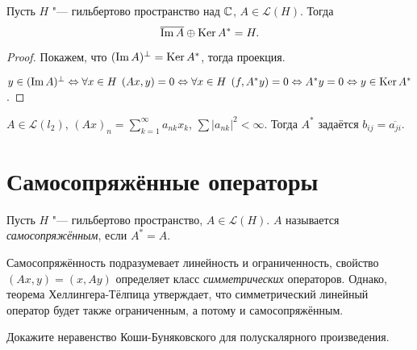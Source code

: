 \documentclass[main]{subfiles}
\begin{document}
\begin{theorem}%
  Пусть $H$ "--- гильбертово пространство над $\mathbb{C}$,
  $A \in \mathcal{L}(H)$. Тогда
  \[
    \overline{\operatorname{Im} A} \oplus \operatorname{Ker} A^* = H.
  \]
\end{theorem}
\begin{proof}
  Покажем, что $(\operatorname{Im} A)^\perp = \operatorname{Ker} A^*$,
  тогда проекция.

  $y \in (\operatorname{Im} A)^\perp \Leftrightarrow
  \forall {x \in H} \; \, (Ax, y) = 0
  \Leftrightarrow \forall {x \in H} \; \, (f, A^* y) = 0
  \Leftrightarrow A^* y = 0 \Leftrightarrow y \in \operatorname{Ker} A^*$.
\end{proof}

\begin{exercise}
  $A \in \mathcal{L}(l_2)$,
  $(Ax)_n = \sum_{k=1}^\infty a_{nk} x_k$,
  $\sum |a_{nk}|^2 < \infty$.
  Тогда $A^*$ задаётся $b_{ij} = \overline{a_{ji}}$.
\end{exercise}

\section{Самосопряжённые операторы}

\begin{definition}
  Пусть $H$ "--- гильбертово пространство,
  $A \in \mathcal{L}(H)$. $A$ называется
  \emph{самосопряжённым}, если $A^* = A$.
\end{definition}

\begin{remark}
  Самосопряжённость подразумевает линейность и ограниченность,
  свойство $(Ax, y) = (x, Ay)$ определяет класс
  \emph{симметрических} операторов.
  Однако, теорема Хеллингера-Тёлпица утверждает,
  что симметрический линейный оператор будет также ограниченным,
  а потому и самосопряжённым.
\end{remark}

\begin{exercise}
  Докажите неравенство Коши-Буняковского для полускалярного
  произведения.
\end{exercise}
\end{document}
